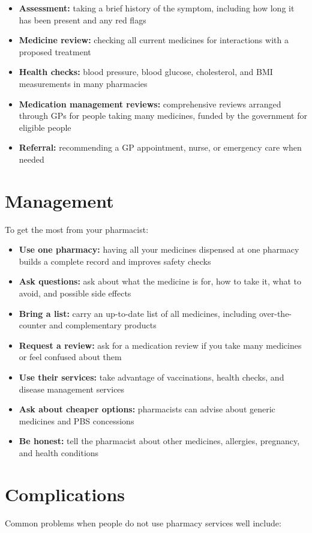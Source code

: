 \begin{itemize}
    \item \textbf{Assessment:} taking a brief history of the symptom, including how long it has been present and any red flags
    \item \textbf{Medicine review:} checking all current medicines for interactions with a proposed treatment
    \item \textbf{Health checks:} blood pressure, blood glucose, cholesterol, and BMI measurements in many pharmacies
    \item \textbf{Medication management reviews:} comprehensive reviews arranged through GPs for people taking many medicines, funded by the government for eligible people
    \item \textbf{Referral:} recommending a GP appointment, nurse, or emergency care when needed
\end{itemize}

\section*{Management}
To get the most from your pharmacist:

\begin{itemize}
    \item \textbf{Use one pharmacy:} having all your medicines dispensed at one pharmacy builds a complete record and improves safety checks
    \item \textbf{Ask questions:} ask about what the medicine is for, how to take it, what to avoid, and possible side effects
    \item \textbf{Bring a list:} carry an up-to-date list of all medicines, including over-the-counter and complementary products
    \item \textbf{Request a review:} ask for a medication review if you take many medicines or feel confused about them
    \item \textbf{Use their services:} take advantage of vaccinations, health checks, and disease management services
    \item \textbf{Ask about cheaper options:} pharmacists can advise about generic medicines and PBS concessions
    \item \textbf{Be honest:} tell the pharmacist about other medicines, allergies, pregnancy, and health conditions
\end{itemize}

\section*{Complications}
Common problems when people do not use pharmacy services well include:

